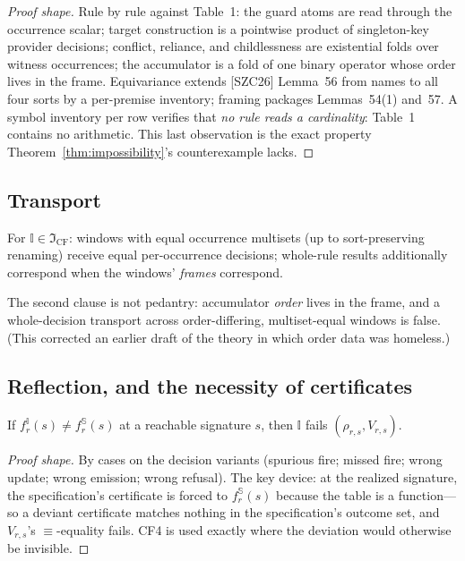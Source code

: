 \documentclass[sigplan,screen,review,nonacm]{acmart}
\newcommand{\Spec}{\ensuremath{\mathbb S}}
\newcommand{\Impl}{\ensuremath{\mathbb I}}
\newcommand{\CF}{\ensuremath{\mathfrak I_{\mathrm{CF}}}}
\newcommand{\SZC}{[SZC26]}
\begin{document}
\begin{proof}[Proof shape]
Rule by rule against Table~1: the guard atoms are read through the occurrence
scalar; target construction is a pointwise product of singleton-key provider
decisions; conflict, reliance, and childlessness are existential folds over
witness occurrences; the accumulator is a fold of one binary operator whose
order lives in the frame. Equivariance extends \SZC{} Lemma~56 from names to
all four sorts by a per-premise inventory; framing packages Lemmas~54(1)
and~57. A symbol inventory per row verifies that \emph{no rule reads a
cardinality}: Table~1 contains no arithmetic. This last observation is the
exact property Theorem~\ref{thm:impossibility}'s counterexample lacks.
\end{proof}

\subsection{Transport}

\begin{lemma}[transport]\label{lem:transport}
For $\Impl \in \CF$: windows with equal occurrence multisets (up to
sort-preserving renaming) receive equal per-occurrence decisions; whole-rule
results additionally correspond when the windows' \emph{frames} correspond.
\end{lemma}

The second clause is not pedantry: accumulator \emph{order} lives in the frame,
and a whole-decision transport across order-differing, multiset-equal windows
is false. (This corrected an earlier draft of the theory in which order data
was homeless.)

\subsection{Reflection, and the necessity of certificates}\label{sec:reflection}

\begin{lemma}\label{lem:reflection}
If $f_r^{\Impl}(s) \neq f_r^{\Spec}(s)$ at a reachable signature $s$, then
$\Impl$ fails $(\rho_{r,s}, V_{r,s})$.
\end{lemma}

\begin{proof}[Proof shape]
By cases on the decision variants (spurious fire; missed fire; wrong update;
wrong emission; wrong refusal). The key device: at the realized signature, the
specification's certificate is forced to $f_r^{\Spec}(s)$ because the table is
a function---so a deviant certificate matches nothing in the specification's
outcome set, and $V_{r,s}$'s $\equiv$-equality fails. CF4 is used exactly where
the deviation would otherwise be invisible.
\end{proof}
\end{document}
